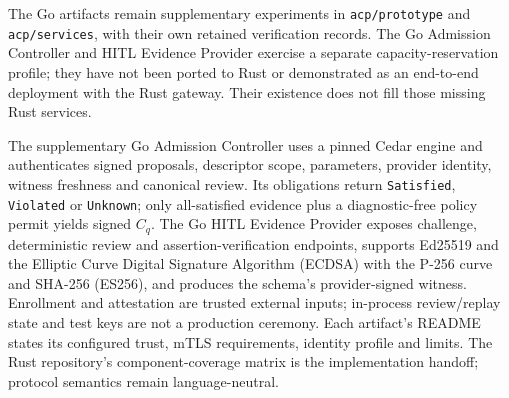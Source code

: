 The Go artifacts remain supplementary experiments in \texttt{acp/prototype} and \texttt{acp/services}, with their own retained verification records. The Go Admission Controller and HITL Evidence Provider exercise a separate capacity-reservation profile; they have not been ported to Rust or demonstrated as an end-to-end deployment with the Rust gateway. Their existence does not fill those missing Rust services.

The supplementary Go Admission Controller uses a pinned Cedar engine and authenticates signed proposals, descriptor scope, parameters, provider identity, witness freshness and canonical review. Its obligations return \texttt{Satisfied}, \texttt{Violated} or \texttt{Unknown}; only all-satisfied evidence plus a diagnostic-free policy permit yields signed $C_q$. The Go HITL Evidence Provider exposes challenge, deterministic review and assertion-verification endpoints, supports Ed25519 and the Elliptic Curve Digital Signature Algorithm (ECDSA) with the P-256 curve and SHA-256 (ES256), and produces the schema's provider-signed witness. Enrollment and attestation are trusted external inputs; in-process review/replay state and test keys are not a production ceremony. Each artifact's README states its configured trust, mTLS requirements, identity profile and limits. The Rust repository's component-coverage matrix is the implementation handoff; protocol semantics remain language-neutral.
